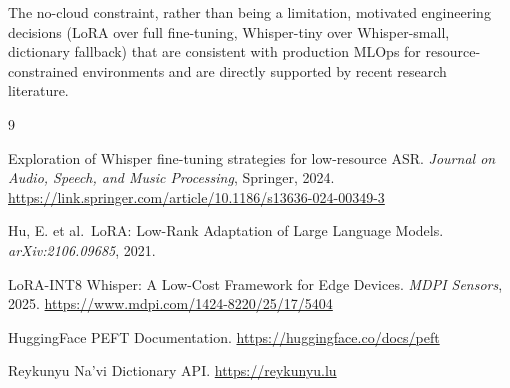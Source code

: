 \documentclass[12pt,a4paper]{article}
\begin{document}
The no-cloud constraint, rather than being a limitation, motivated engineering decisions
(LoRA over full fine-tuning, Whisper-tiny over Whisper-small, dictionary fallback) that
are consistent with production MLOps for resource-constrained environments and are
directly supported by recent research literature.

\begin{thebibliography}{9}

  Exploration of Whisper fine-tuning strategies for low-resource ASR.
  \textit{Journal on Audio, Speech, and Music Processing}, Springer, 2024.
  \url{https://link.springer.com/article/10.1186/s13636-024-00349-3}

  Hu, E. et al.\ LoRA: Low-Rank Adaptation of Large Language Models.
  \textit{arXiv:2106.09685}, 2021.

  LoRA-INT8 Whisper: A Low-Cost Framework for Edge Devices.
  \textit{MDPI Sensors}, 2025.
  \url{https://www.mdpi.com/1424-8220/25/17/5404}

  HuggingFace PEFT Documentation.
  \url{https://huggingface.co/docs/peft}

  Reykunyu Na'vi Dictionary API.
  \url{https://reykunyu.lu}

\end{thebibliography}
\end{document}

